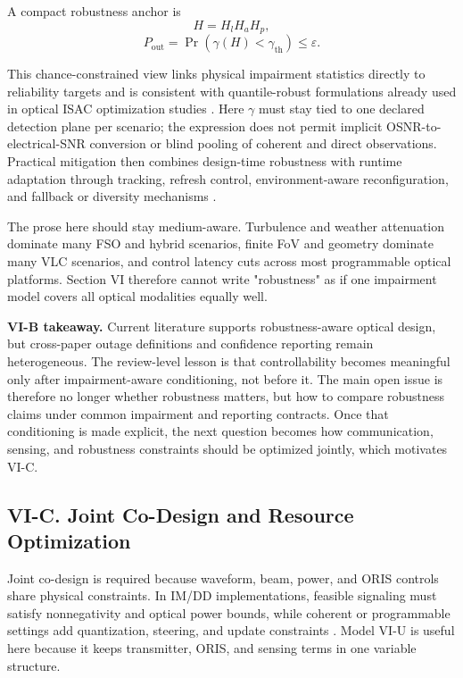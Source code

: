 A compact robustness anchor is
\[
H=H_l H_a H_p,
\]
\[
P_{\text{out}}=\Pr\!\left(\gamma(H)<\gamma_{\text{th}}\right)\le \varepsilon.
\]

This chance-constrained view links physical impairment statistics directly to reliability targets and is consistent with quantile-robust formulations already used in optical ISAC optimization studies \cite{O_ISAC_023,O_ISAC_061,O_ISAC_091}. Here $\gamma$ must stay tied to one declared detection plane per scenario; the expression does not permit implicit OSNR-to-electrical-SNR conversion or blind pooling of coherent and direct observations. Practical mitigation then combines design-time robustness with runtime adaptation through tracking, refresh control, environment-aware reconfiguration, and fallback or diversity mechanisms \cite{O_ISAC_098,O_ISAC_112,O_ISAC_127,O_ISAC_199}.

The prose here should stay medium-aware. Turbulence and weather attenuation dominate many FSO and hybrid scenarios, finite FoV and geometry dominate many VLC scenarios, and control latency cuts across most programmable optical platforms. Section VI therefore cannot write "robustness" as if one impairment model covers all optical modalities equally well.

\textbf{VI-B takeaway.} Current literature supports robustness-aware optical design, but cross-paper outage definitions and confidence reporting remain heterogeneous. The review-level lesson is that controllability becomes meaningful only after impairment-aware conditioning, not before it. The main open issue is therefore no longer whether robustness matters, but how to compare robustness claims under common impairment and reporting contracts. Once that conditioning is made explicit, the next question becomes how communication, sensing, and robustness constraints should be optimized jointly, which motivates VI-C.

\subsection{VI-C. Joint Co-Design and Resource Optimization}

Joint co-design is required because waveform, beam, power, and ORIS controls share physical constraints. In IM/DD implementations, feasible signaling must satisfy nonnegativity and optical power bounds, while coherent or programmable settings add quantization, steering, and update constraints \cite{O_ISAC_009,O_ISAC_023,O_ISAC_054,O_ISAC_061,O_ISAC_091,O_ISAC_127}. Model VI-U is useful here because it keeps transmitter, ORIS, and sensing terms in one variable structure.

